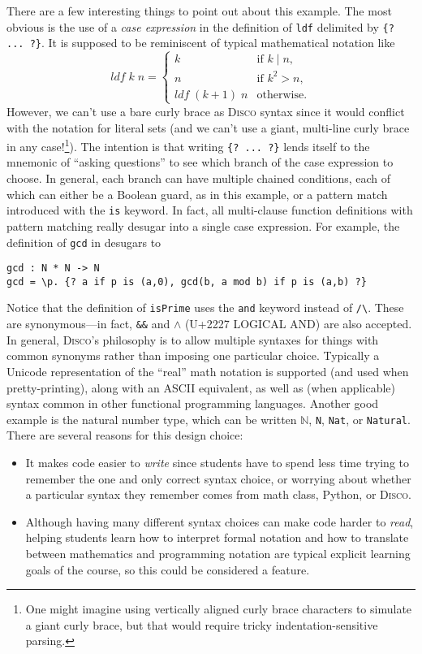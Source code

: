 \documentclass[submission,copyright,creativecommons]{eptcs}
\newcommand{\disco}{\textsc{Disco}\xspace}
\newcommand{\pref}[1]{\prettyref{#1}}
\newcommand{\N}{\mathbb{N}}
\begin{document}
There are a few interesting things to point out about this example.
The most obvious is the use of a \emph{case expression} in the
definition of \verb|ldf| delimited by \verb|{? ... ?}|.  It is
supposed to be reminiscent of typical mathematical notation like
\[ \mathit{ldf}\;k\;n = \begin{cases} k & \text{if } k \mid n, \\ n &
    \text{if } k^2 > n, \\ \mathit{ldf}\;(k+1)\;n &
    \text{otherwise.} \end{cases} \] However, we can't use a bare
curly brace as \disco syntax since it would conflict with the notation
for literal sets (and we can't use a giant, multi-line curly brace in
any case!\footnote{One might imagine using vertically aligned curly
  brace characters to simulate a giant curly brace, but that would require
  tricky indentation-sensitive parsing.}).  The intention is that writing %
\verb|{? ... ?}| lends itself to the mnemonic of ``asking questions''
to see which branch of the case expression to choose.  In general,
each branch can have multiple chained conditions, each of which can
either be a Boolean guard, as in this example, or a pattern match
introduced with the \verb|is| keyword.  In fact, all multi-clause
function definitions with pattern matching really desugar into a
single case expression. For example, the definition of \verb|gcd| in
\pref{lst:gcd} desugars to
\begin{verbatim}
gcd : N * N -> N
gcd = \p. {? a if p is (a,0), gcd(b, a mod b) if p is (a,b) ?}
\end{verbatim}

Notice that the definition of \verb|isPrime| uses the \verb|and|
keyword instead of \verb|/\|.  These are synonymous---in fact,
\verb|&&| and $\land$ (U+2227 LOGICAL AND) are also accepted.  In
general, \disco's philosophy is to allow multiple syntaxes for things
with common synonyms rather than imposing one particular choice.
Typically a Unicode representation of the ``real'' math notation is
supported (and used when pretty-printing), along with an ASCII
equivalent, as well as (when applicable) syntax common in other
functional programming languages.  Another good example is the natural
number type, which can be written $\N$, \verb|N|, \verb|Nat|, or
\verb|Natural|.  There are several reasons for this design choice:
\begin{itemize}
\item It makes code easier to \emph{write} since students have to
  spend less time trying to remember the one and only correct syntax
  choice, or worrying about whether a particular syntax they remember
  comes from math class, Python, or \disco.
\item Although having many different syntax choices can make code
  harder to \emph{read}, helping students learn how to interpret
  formal notation and how to translate between mathematics and
  programming notation are typical explicit learning goals of the
  course, so this could be considered a feature.
\end{itemize}
\end{document}
